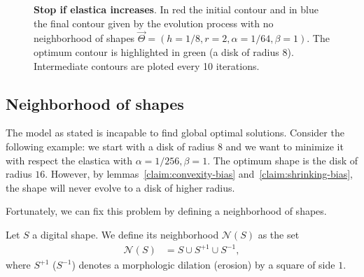 \documentclass[smallextended]{svjour3}
\begin{document}
\begin{figure}
	\caption{\textbf{Stop if elastica increases}. In red the initial contour and in blue the final contour given by the evolution process with no neighborhood of shapes $\vec{\Theta} = (h=1/8,r=2,\alpha=1/64,\beta=1)$. The optimum contour is highlighted in green (a disk of radius $8$). Intermediate contours are ploted every 10 iterations.}
	\label{fig:no-neighborhood-shapes-evolution-improve-always}
\end{figure}

\subsection{Neighborhood of shapes}

The model as stated is incapable to find global optimal solutions. Consider the following example: we start with a disk of radius $8$ and we want to minimize it with respect the elastica with $\alpha =1/256, \beta=1$. The optimum shape is the disk of radius $16$. However, by lemmas~\ref{claim:convexity-bias} and~\ref{claim:shrinking-bias}, the shape will never evolve to a disk of higher radius.

Fortunately, we can fix this problem by defining a neighborhood of shapes. 

\begin{definition}
	Let $S$ a digital shape. We define its neighborhood $\mathcal{N}(S)$ as the set
	\begin{align*}
		\mathcal{N}(S) &= S \cup S^{+1} \cup S^{-1},
	\end{align*}
	where $S^{+1}$ ($S^{-1}$) denotes a morphologic dilation (erosion) by a square of side $1$.
\end{definition}
\end{document}
